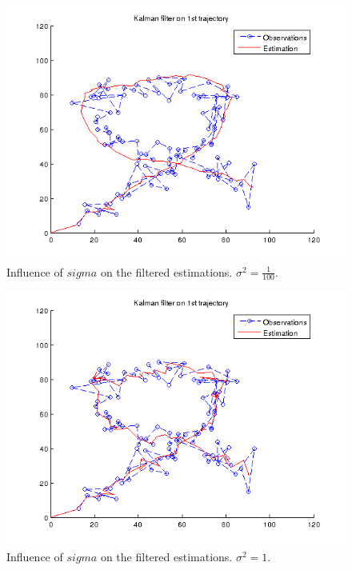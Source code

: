 \documentclass[a4paper, 12pt, titlepage]{article}
\begin{document}
\begin{figure}
	\includegraphics[width=15cm]{images/sigma01.png}
	\caption{Influence of $sigma$ on the filtered estimations. $\sigma^2=\frac{1}{100}$.}
	\label{fig:4}
\end{figure}

\begin{figure}
	\includegraphics[width=15cm]{images/sigma1.png}
	\caption{Influence of $sigma$ on the filtered estimations. $\sigma^2=1$.}
	\label{fig:5}
\end{figure}
\end{document}
